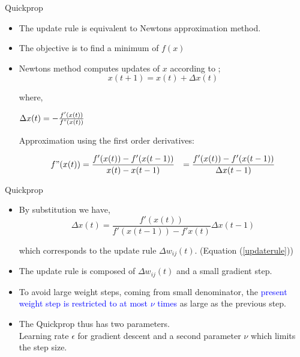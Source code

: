 \documentclass{beamer}
\begin{document}
\begin{frame}{Quickprop}
\begin{itemize}
\item The update rule is equivalent to Newtons approximation method. 
\item The objective is to find a minimum of $ f(x) $
\item Newtons method computes updates of $ x $ according to ;
\begin{equation*}
x(t+1) = x(t) + \Delta x(t)
\end{equation*}

where,

$ \Delta x(t)  = - \frac{f'(x(t))}{f"(x(t))}$ 

\vspace{2mm}
Approximation using the first order derivatives: 

\begin{align*}
f"(x(t)) &= \frac{f'(x(t)) - f'(x(t-1))}{x(t) - x(t-1)}
		 &= \frac{f'(x(t)) - f'(x(t-1))} {\Delta x(t-1)}	
\end{align*} 
\end{itemize}
\end{frame}	

\begin{frame}{Quickprop}
\begin{itemize}
\item By substitution we have, 
\begin{equation}
\Delta x(t) =  \frac{f'(x(t))} { f'(x(t-1)) -f'x(t)} \Delta x(t-1)  
\end{equation}

which corresponds to the update rule  $ \Delta w_{ij}(t) $. (Equation (\ref{updaterule}))

\item The update rule is composed of $ \Delta w_{ij}(t) $ and a small gradient step. \\ 

\pause
\vspace{4mm}
\item To avoid large weight steps, coming from small denominator, the \textcolor{blue}{present weight step is restricted to at most $ \nu $ times} as large as the previous step. \\

\item The Quickprop thus has two parameters. \\
Learning rate $ \epsilon $ for gradient descent and a second parameter $ \nu  $ which limits the step size. 
	
\end{itemize}	

\end{frame}	
\end{document}
